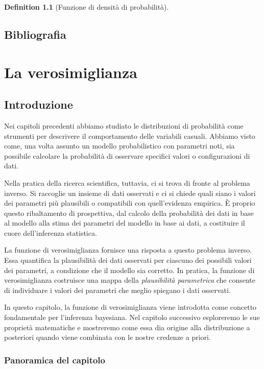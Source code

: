 \documentclass[
  letterpaper,
  DIV=11,
  numbers=noendperiod,
  oneside]{scrreprt}
\theoremstyle{definition}
\theoremstyle{plain}
\theoremstyle{definition}
\newtheorem{definition}{Definition}[chapter]
\theoremstyle{remark}
\begin{document}
\begin{definition}[Funzione di densità di
probabilità]
\section*{Bibliografia}\label{bibliografia-9}


\chapter{La verosimiglianza}\label{sec-prob-likelihood}

\section*{Introduzione}\label{introduzione-13}


Nei capitoli precedenti abbiamo studiato le distribuzioni di probabilità
come strumenti per descrivere il comportamento delle variabili casuali.
Abbiamo visto come, una volta assunto un modello probabilistico con
parametri noti, sia possibile calcolare la probabilità di osservare
specifici valori o configurazioni di dati.

Nella pratica della ricerca scientifica, tuttavia, ci si trova di fronte
al problema inverso. Si raccoglie un insieme di dati osservati e ci si
chiede quali siano i valori dei parametri più plausibili o compatibili
con quell'evidenza empirica. È proprio questo ribaltamento di
prospettiva, dal calcolo della probabilità dei dati in base al modello
alla stima dei parametri del modello in base ai dati, a costituire il
cuore dell'inferenza statistica.

La funzione di verosimiglianza fornisce una risposta a questo problema
inverso. Essa quantifica la plausibilità dei dati osservati per ciascuno
dei possibili valori dei parametri, a condizione che il modello sia
corretto. In pratica, la funzione di verosimiglianza costruisce una
mappa della \emph{plausibilità parametrica} che consente di individuare
i valori dei parametri che meglio spiegano i dati osservati.

In questo capitolo, la funzione di verosimiglianza viene introdotta come
concetto fondamentale per l'inferenza bayesiana. Nel capitolo successivo
esploreremo le sue proprietà matematiche e mostreremo come essa dia
origine alla distribuzione a posteriori quando viene combinata con le
nostre credenze a priori.

\subsection*{Panoramica del capitolo}\label{panoramica-del-capitolo-9}


\end{definition}
\end{document}
